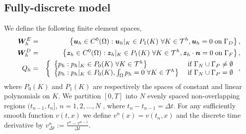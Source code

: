  


\subsection{Fully-discrete model}
\label{sec:fully_discrete}
We define the following finite element spaces,
\begin{eqnarray*}
\boldsymbol{W}^{E}_{h} &=& \left\lbrace \boldsymbol{u}_{h}  \in C^{0}(\Omega): \boldsymbol{u}_{h} |_{K} \in P_{1}(K) \ \forall K \in \mathcal{T}^{h}, \boldsymbol{u}_{h}  = 0 \; \mbox{on} \;\Gamma_{D} \right\rbrace,  \\
\boldsymbol{W}^{D}_{h} &=&\left\lbrace \boldsymbol{z}_{h}  \in C^{0}(\Omega): \boldsymbol{z}_{h} |_{K} \in P_{1}(K) \ \forall K \in \mathcal{T}^{h},  \boldsymbol{z}_{h} \cdot \boldsymbol{n} = 0 \; \mbox{on} \;\Gamma_{F} \right\rbrace, \\
{Q}_{h} &=& \left\lbrace
  \begin{array}{l l}
    \left\lbrace p_h: p_h |_{K} \in P_{0}(K) \ \forall K \in \mathcal{T}^{h} \right\rbrace & \; \text{if $\Gamma_{N} \cup \Gamma_{P} \neq \emptyset$}\\
    \left\lbrace p_h: p_h |_{K} \in P_{0}(K), \int_{\Omega}  p_h =0 \ \forall K \in \mathcal{T}^{h}\right\rbrace & \; \text{if $\Gamma_{N} \cup \Gamma_{P}=\emptyset$}
  \end{array} \right. ,
\end{eqnarray*}
where $P_{0}(K)$ and $P_{1}(K)$ are respectively the spaces of constant and linear polynomials on $K$. We partition $[0,T]$ into $N$ evenly spaced non-overlapping regions $(t_{n-1}, t_n]$, $n=1,2,\dots, N$ , where $t_n-t_{n-1} = \Delta t$. For any sufficiently smooth function $v(t,x)$ we define $v^n(x) = v(t_n,x)$  and the discrete time derivative by $v_{\Delta t}^{n} := \frac{v^{n}-v^{n-1}}{\Delta t}$.

